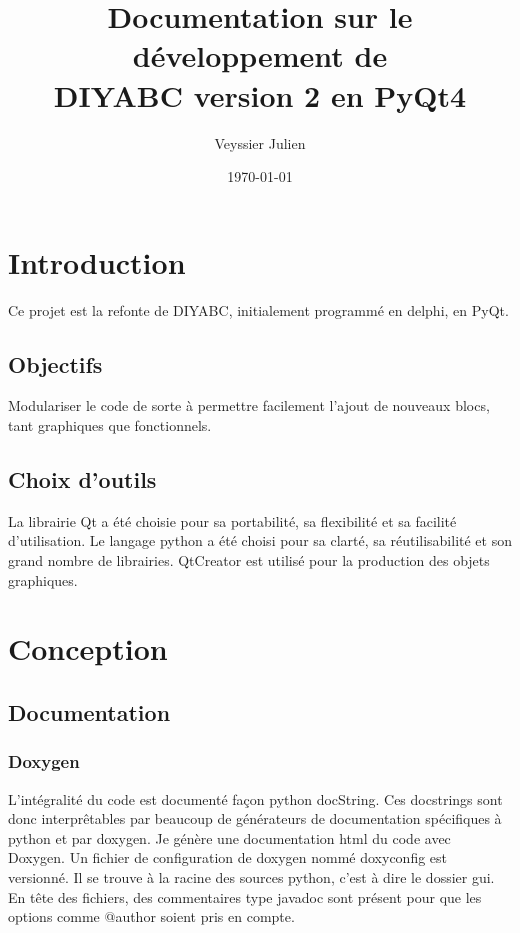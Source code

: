 \documentclass[12pt,a4paper]{article}
\author{Veyssier Julien}
\title{Documentation sur le développement de \\
DIYABC version 2 en PyQt4}
\date\today
\begin{document}
\maketitle
\newpage

\tableofcontents

\newpage
 

\section{Introduction}
Ce projet est la refonte de DIYABC, initialement programmé en delphi, en PyQt.
	\subsection{Objectifs}
        Modulariser le code de sorte à permettre facilement l'ajout de nouveaux
        blocs, tant graphiques que fonctionnels.

	\subsection{Choix d'outils}
        La librairie Qt a été choisie pour sa portabilité, sa flexibilité et sa
        facilité d'utilisation. Le langage python a été choisi pour sa clarté,
        sa réutilisabilité et son grand nombre de librairies. QtCreator est
        utilis\'e pour la production des objets graphiques.

\section{Conception}
    \subsection{Documentation}
    \subsubsection{Doxygen}
    L'intégralité du code est documenté façon python docString. Ces docstrings
    sont donc interprêtables par beaucoup de générateurs de documentation
    spécifiques à python et par doxygen.  Je génère une documentation html du
    code avec Doxygen. Un fichier de configuration de doxygen nommé doxyconfig
    est versionné. Il se trouve à la racine des sources python, c'est à dire le
    dossier gui. En tête des fichiers, des commentaires type
    javadoc sont présent pour que les options comme @author soient pris en
    compte.\\
\end{document}
